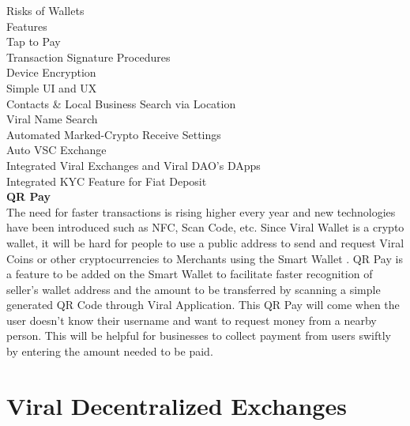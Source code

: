 \documentclass[conference]{IEEEtran}
\begin{document}
Risks of Wallets\\

Features\\

Tap to Pay\\

Transaction Signature Procedures\\

Device Encryption\\

Simple UI and UX\\

Contacts \& Local Business Search via Location\\

Viral Name Search\\

Automated Marked-Crypto Receive Settings\\

Auto VSC Exchange\\

Integrated Viral Exchanges and Viral DAO's DApps\\

Integrated KYC Feature for Fiat Deposit\\

\textbf{QR Pay}\\

The need for faster transactions is rising higher every year and new technologies have been introduced such as NFC, Scan Code, etc. Since Viral Wallet is a crypto wallet, it will be hard for people to use a public address to send and request Viral Coins or other cryptocurrencies to Merchants using the Smart Wallet . QR Pay is a feature to be added on the Smart Wallet to facilitate faster recognition of seller’s wallet address and the amount to be transferred by scanning a simple generated QR Code through Viral Application. This QR Pay will come when the user doesn’t know their username and want to request money from a nearby person. This will be helpful for businesses to collect payment from users swiftly by entering the amount needed to be paid.\\

\section{\textbf{Viral Decentralized Exchanges}}
\end{document}
